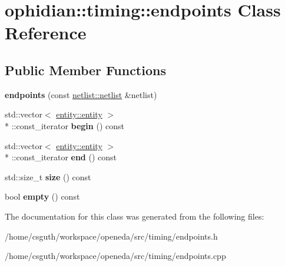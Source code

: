 \hypertarget{classophidian_1_1timing_1_1endpoints}{\section{ophidian\-:\-:timing\-:\-:endpoints Class Reference}
\label{classophidian_1_1timing_1_1endpoints}
}
\subsection*{Public Member Functions}
\begin{DoxyCompactItemize}
\item 
\hypertarget{classophidian_1_1timing_1_1endpoints_a62ced46f42aad54aeb384e7a963a3e56}{{\bfseries endpoints} (const \hyperlink{classophidian_1_1netlist_1_1netlist}{netlist\-::netlist} \&netlist)}\label{classophidian_1_1timing_1_1endpoints_a62ced46f42aad54aeb384e7a963a3e56}

\item 
\hypertarget{classophidian_1_1timing_1_1endpoints_afbcfe10781742f1db99a0cbf07f46f00}{std\-::vector$<$ \hyperlink{classophidian_1_1entity_1_1entity}{entity\-::entity} $>$\\*
\-::const\-\_\-iterator {\bfseries begin} () const }\label{classophidian_1_1timing_1_1endpoints_afbcfe10781742f1db99a0cbf07f46f00}

\item 
\hypertarget{classophidian_1_1timing_1_1endpoints_aca5cc64f3f8782a64eaf121e0300754c}{std\-::vector$<$ \hyperlink{classophidian_1_1entity_1_1entity}{entity\-::entity} $>$\\*
\-::const\-\_\-iterator {\bfseries end} () const }\label{classophidian_1_1timing_1_1endpoints_aca5cc64f3f8782a64eaf121e0300754c}

\item 
\hypertarget{classophidian_1_1timing_1_1endpoints_af743daa36f144a33837719b44767958a}{std\-::size\-\_\-t {\bfseries size} () const }\label{classophidian_1_1timing_1_1endpoints_af743daa36f144a33837719b44767958a}

\item 
\hypertarget{classophidian_1_1timing_1_1endpoints_a935ba04e18e780a70d3a11c8ad12e2c6}{bool {\bfseries empty} () const }\label{classophidian_1_1timing_1_1endpoints_a935ba04e18e780a70d3a11c8ad12e2c6}

\end{DoxyCompactItemize}


The documentation for this class was generated from the following files\-:\begin{DoxyCompactItemize}
\item 
/home/csguth/workspace/openeda/src/timing/endpoints.\-h\item 
/home/csguth/workspace/openeda/src/timing/endpoints.\-cpp\end{DoxyCompactItemize}
